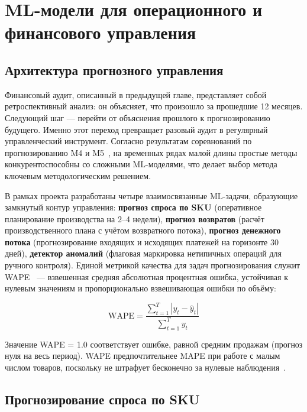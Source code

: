\chapter{ML-модели для операционного и финансового управления}
\label{ch:ml}

\section{Архитектура прогнозного управления}

Финансовый аудит, описанный в предыдущей главе, представляет собой ретроспективный анализ: он объясняет, что произошло за прошедшие 12 месяцев. Следующий шаг --- перейти от объяснения прошлого к прогнозированию будущего. Именно этот переход превращает разовый аудит в регулярный управленческий инструмент. Согласно результатам соревнований по прогнозированию M4 и M5~\cite{makridakis2018m4,makridakis2022m5}, на временных рядах малой длины простые методы конкурентоспособны со сложными ML-моделями, что делает выбор метода ключевым методологическим решением.

В рамках проекта разработаны четыре взаимосвязанные ML-задачи, образующие замкнутый контур управления: \textbf{прогноз спроса по SKU} (оперативное планирование производства на 2--4 недели), \textbf{прогноз возвратов} (расчёт производственного плана с учётом возвратного потока), \textbf{прогноз денежного потока} (прогнозирование входящих и исходящих платежей на горизонте 30 дней), \textbf{детектор аномалий} (флаговая маркировка нетипичных операций для ручного контроля). Единой метрикой качества для задач прогнозирования служит WAPE~\cite{hyndman2006another} --- взвешенная средняя абсолютная процентная ошибка, устойчивая к нулевым значениям и пропорционально взвешивающая ошибки по объёму:

\begin{equation}
\text{WAPE} = \frac{\sum_{t=1}^{T} |y_t - \hat{y}_t|}{\sum_{t=1}^{T} y_t}
\end{equation}

Значение WAPE = 1.0 соответствует ошибке, равной средним продажам (прогноз нуля на весь период). WAPE предпочтительнее MAPE при работе с малым числом товаров, поскольку не штрафует бесконечно за нулевые наблюдения~\cite{makridakis2022m5}.

\section{Прогнозирование спроса по SKU}

